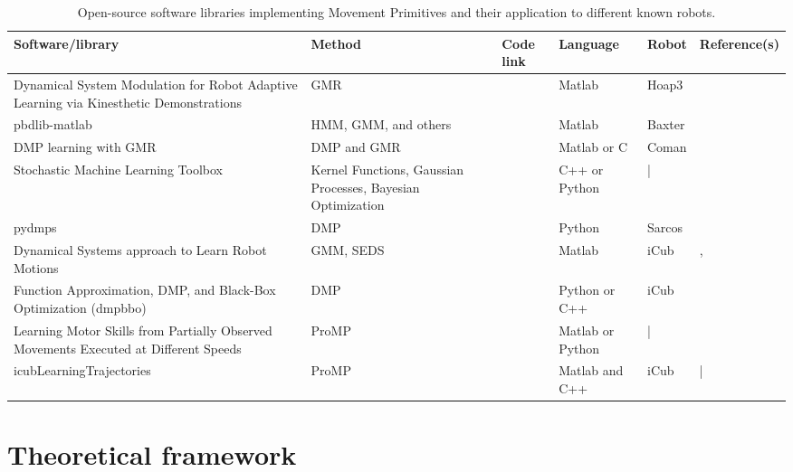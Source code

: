 \documentclass[utf8]{frontiersSCNS} %
\begin{document}
\begin{table}
\begin{center}
\begin{tabular}{|p{5.5cm}|p{3cm}|p{2cm}|p{1.5cm}|p{2cm}| p{2cm}|}
  \hline
  \textbf{Software/library} & \textbf{Method} & \textbf{Code link} & \textbf{Language} & \textbf{Robot} & \textbf{Reference(s)}\tabularnewline
  \hline
Dynamical System Modulation for Robot Adaptive Learning via Kinesthetic Demonstrations & GMR & \cite{gmr} & Matlab & Hoap3 & \cite{hersch2008dynamical}\tabularnewline
  \hline
pbdlib-matlab & HMM, GMM, and others & \cite{pbdlib} & Matlab & Baxter & \cite{Calinon16JIST} \tabularnewline
  \hline
DMP learning with GMR  & DMP and GMR & \cite{StatisticalDynamical}  & Matlab or C & Coman & \cite{Calinon12Hum} \tabularnewline
\hline
Stochastic Machine Learning Toolbox & Kernel Functions, Gaussian Processes, Bayesian Optimization & \cite{smlt} & C++ or Python &  | & \tabularnewline
\hline
  pydmps & DMP & \cite{pydmps} & Python & Sarcos & \cite{ijspeert2013dynamical}\tabularnewline
  \hline
   Dynamical Systems approach to Learn Robot Motions & GMM, SEDS & \cite{seds} & Matlab & iCub & \cite{khansari2011learning}, \cite{khansari2012dynamical} \tabularnewline
  \hline

Function Approximation, DMP, and Black-Box Optimization (dmpbbo) &  DMP  & \cite{dmpbbo} & Python or C++ & iCub & \cite{lober2014multiple,2013ACTI2891} \tabularnewline
  \hline  
  Learning Motor Skills from Partially Observed Movements Executed at Different Speeds & ProMP & \cite{marcoProg} & Matlab or Python & | & \cite{ewerton2015learning}\tabularnewline
  \hline
\rowcolor{yellow} icubLearningTrajectories & ProMP & \cite{icubLearningTrajectories} & Matlab and C++ & iCub & | \tabularnewline
\hline
\end{tabular}
\end{center}

\label{table:software}
\caption{Open-source software libraries implementing Movement Primitives and their application to different known robots.}
\end{table}



\section{Theoretical framework}
\label{sec:theory}
\end{document}

